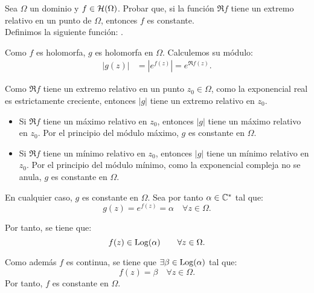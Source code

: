 \begin{ejercicio}
    Sea $\Omega$ un dominio y $f\in \mathcal{H}(\Omega)$. Probar que, si la función $\Re f$ tiene un extremo relativo en un punto de $\Omega$, entonces $f$ es constante.\\

    Definimos la siguiente función:
    .

    Como $f$ es holomorfa, $g$ es holomorfa en $\Omega$. Calculemos su módulo:
    \begin{align*}
        |g(z)| &= |e^{f(z)}| = e^{\Re f(z)}.
    \end{align*}

    Como $\Re f$ tiene un extremo relativo en un punto $z_0\in \Omega$, como la exponencial real es estrictamente creciente, entonces $|g|$ tiene un extremo relativo en $z_0$.
    \begin{itemize}
        \item Si $\Re f$ tiene un máximo relativo en $z_0$, entonces $|g|$ tiene un máximo relativo en $z_0$. Por el principio del módulo máximo, $g$ es constante en $\Omega$.
        \item Si $\Re f$ tiene un mínimo relativo en $z_0$, entonces $|g|$ tiene un mínimo relativo en $z_0$. Por el principio del módulo mínimo, como la exponencial compleja no se anula, $g$ es constante en $\Omega$.
    \end{itemize}

    En cualquier caso, $g$ es constante en $\Omega$. Sea por tanto $\alpha\in \mathbb{C}^*$ tal que:
    \begin{equation*}
        g(z) = e^{f(z)} = \alpha \quad \forall z\in \Omega.
    \end{equation*}

    Por tanto, se tiene que:
    \begin{equation*}
        f(z) \in \operatorname{Log}(\alpha)\qquad \forall z\in \Omega.
    \end{equation*}

    Como además $f$ es continua, se tiene que $\exists \beta\in \operatorname{Log}(\alpha)$ tal que:
    \begin{equation*}
        f(z) = \beta \quad \forall z\in \Omega.
    \end{equation*}
    Por tanto, $f$ es constante en $\Omega$.
\end{ejercicio}

